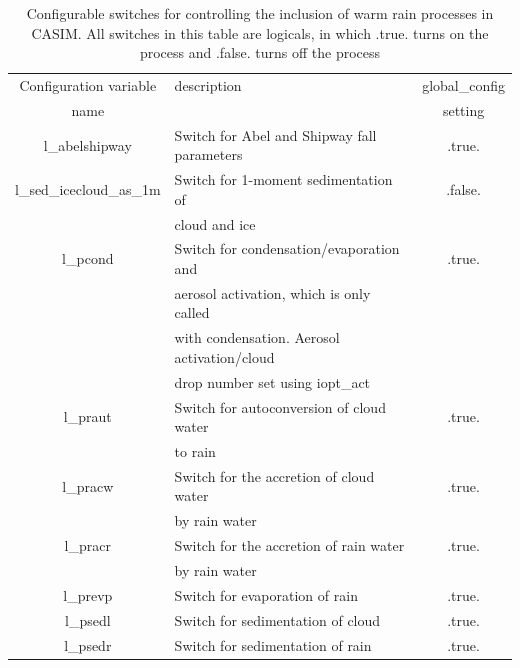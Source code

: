 \documentclass[a4paper,11pt]{article}
\begin{document}
\begin{table}[H]
  \protect\caption{Configurable switches for controlling the inclusion of warm rain
   processes in CASIM. All switches in this table are logicals, in which .true. turns
   on the process and .false. turns off the process}
\label{tab:warm_casim_setup}
\begin{tabular}{|c|l|c|}
\hline
Configuration variable & description & global\_config \tabularnewline
name &  & setting \tabularnewline
\hline
\hline
  l\_abelshipway & Switch for Abel and Shipway fall parameters & .true. \tabularnewline
\hline
  l\_sed\_icecloud\_as\_1m & Switch for 1-moment sedimentation of & .false. \tabularnewline
    & cloud and ice & \tabularnewline
\hline
  l\_pcond &  Switch for condensation/evaporation and & .true. \tabularnewline
    & aerosol activation, which is only called & \tabularnewline
    & with condensation. Aerosol activation/cloud  & \tabularnewline
    & drop number set using iopt\_act & \tabularnewline
\hline
  l\_praut & Switch for autoconversion of cloud water & .true. \tabularnewline
    & to rain & \tabularnewline
\hline
  l\_pracw & Switch for the accretion of cloud water & .true. \tabularnewline
    & by rain water & \tabularnewline
\hline
  l\_pracr & Switch for the accretion of rain water & .true. \tabularnewline
    & by rain water & \tabularnewline
\hline
  l\_prevp & Switch for evaporation of rain & .true. \tabularnewline
\hline
  l\_psedl & Switch for sedimentation of cloud & .true. \tabularnewline
\hline
  l\_psedr & Switch for sedimentation of rain & .true. \tabularnewline
\hline
\hline
\end{tabular}
\end{table}
\end{document}
